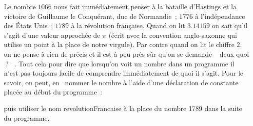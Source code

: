 Le nombre $1066$ nous fait immédiatement penser à la bataille d'Hastings et la victoire de Guillaume le Conquérant, duc de Normandie~;
$1776$  à l'indépendance des États Unis~; $1789$ à la révolution
française. Quand on lit $3.14159$ on sait qu'il s'agit d'une valeur approchée de $\pi$
(écrit avec la convention anglo-saxonne qui utilise un point à la place de notre virgule).
Par contre quand on lit le chiffre $2$, on ne pense à rien de précis et il est à peu près sûr
qu'on se demande
\raisebox{0.25ex}{$\scriptscriptstyle \boldmath\ll$}~%
deux quoi$\:$?%
~\raisebox{0.25ex}{$\scriptscriptstyle \boldmath\gg$}.
Tout cela pour dire que lorsqu'on voit un nombre dans un
programme il n'est pas toujours facile de comprendre immédiatement de quoi il s'agit. Pour le savoir,
on peut, en \ocaml\ nommer le nombre à l'aide d'une déclaration de constante placée au
début du programme~:

{
\parindent {}
\medskip

\vspace{\neglskip}\mbox{}\par

\medskip }

\noindent puis utiliser le nom {\idt revolutionFrancaise} à la place du nombre
{\small\rm 1789} dans la suite du programme.


